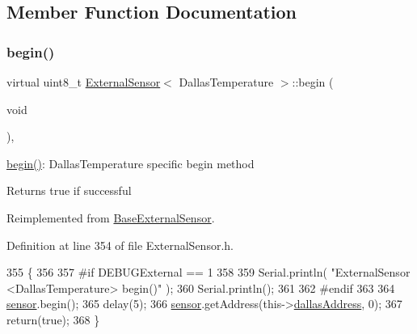 \subsection{Member Function Documentation}
\mbox{\label{class_external_sensor_3_01_dallas_temperature_01_4_ac5275129b05e2ff8df45d5b222a661d9}} 
\subsubsection{\texorpdfstring{begin()}{begin()}}
{\footnotesize\ttfamily virtual uint8\+\_\+t \hyperlink{class_external_sensor}{External\+Sensor}$<$ Dallas\+Temperature $>$\+::begin (\begin{DoxyParamCaption}\item[{void}]{ }\end{DoxyParamCaption})\hspace{0.3cm}{\ttfamily [inline]}, {\ttfamily [virtual]}}

\hyperlink{class_external_sensor_3_01_dallas_temperature_01_4_ac5275129b05e2ff8df45d5b222a661d9}{begin()}\+: Dallas\+Temperature specific begin method

\begin{DoxyReturn}{Returns}
true if successful 
\end{DoxyReturn}


Reimplemented from \hyperlink{class_base_external_sensor_a87d132803d4f4fdd4e66332809f0c9a0}{Base\+External\+Sensor}.



Definition at line 354 of file External\+Sensor.\+h.


\begin{DoxyCode}
355     \{
356     
357 \textcolor{preprocessor}{    #if DEBUGExternal == 1 }
358 
359         Serial.println( \textcolor{stringliteral}{"ExternalSensor <DallasTemperature> begin()"} );
360         Serial.println();
361     
362 \textcolor{preprocessor}{    #endif}
363 
364         \hyperlink{class_external_sensor_3_01_dallas_temperature_01_4_adb6ba4fcdedef95ad8f6b0c9b6c0f9d1}{sensor}.begin(); 
365         delay(5);
366         \hyperlink{class_external_sensor_3_01_dallas_temperature_01_4_adb6ba4fcdedef95ad8f6b0c9b6c0f9d1}{sensor}.getAddress(this->\hyperlink{class_external_sensor_3_01_dallas_temperature_01_4_a7d9e9d2893e453638fcf440e5d8d9082}{dallasAddress}, 0);   
367         \textcolor{keywordflow}{return}(\textcolor{keyword}{true});
368     \}
\end{DoxyCode}
\mbox{\label{class_external_sensor_3_01_dallas_temperature_01_4_a1e725d9338314515d4e5dc456ed6a6c8}} 
